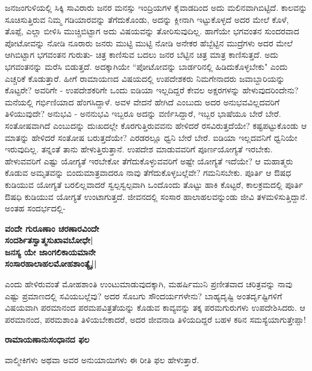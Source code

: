 ಜನಜಂಗುಳಿಯಲ್ಲಿ ಸಿಕ್ಕಿ ಸಾವಿರಾರು ಜನರ ಮನಸ್ಸು ಇಂದ್ರಿಯಗಳ ಕೈವಾಡದಿಂದ ಅದು ಮಲಿನವಾಗಿಬಿಟ್ಟಿದೆ. ಕಾಲವನ್ನು ಸೂಚಿಸುತ್ತಿರುವ ನಿಮ್ಮ ಗಡಿಯಾರವನ್ನು ತೆಗೆದುಕೊಂಡು, ಅದನ್ನು ಕ್ಲೀನಾಗಿ ಇಟ್ಟುಕೊಳ್ಳದೆ ಅದರ ಮೇಲೆ ಕೊಳೆ, ತೊಪ್ಪೆ, ಎಲ್ಲಾ ಬೀಳಿಸಿ ಮುಚ್ಚಿಬಿಟ್ಟಾಗ ಅದು ವಿಷಯವನ್ನು ತೋರಿಸುವುದಿಲ್ಲ. ಹಾಗೆಯೇ ಭಗವಂತನ ಸುಂದರವಾದ ಪೋಟೋವನ್ನು ನೋಡಿ ನೂರಾರು ಜನರು ಮುಟ್ಟಿ ಮುಟ್ಟಿ ನೋಡಿ ಅನೇಕರ ಹೆಬ್ಬೆಟ್ಟಿನ ಮುದ್ರೆಗಳು ಅದರ ಮೇಲೆ ಆಗಿಬಿಟ್ಟಾಗ ಭಗವಂತನ ಗುರುತು- ಚಿತ್ರ ಕಾಣಿಸುವ ಬದಲು ಜನರ ಬೆಟ್ಟಿನ ಚಿತ್ರ ಮಾತ್ರ ಕಾಣಿಸುತ್ತದೆ. ಅದು ಭಗವಂತನನ್ನು ಮರೆಸಿ ಬಿಡುತ್ತದೆ. ಅದಕ್ಕಾಗಿಯೇ ``ಪೋಟೋವನ್ನು ಬಾರ್ಡರಿನಲ್ಲಿ ಹಿಡಿದುಕೊಳ್ಳಬೇಕು" ಎಂದು ಎಚ್ಚರಿಕೆ ಕೊಡುತ್ತಾರೆ. ಹೀಗೆ ರಾಮಾಯಣದ ವಿಷಯದಲ್ಲಿ ಉಪದೇಶಕರು ನಿಮಗೇನಾದರು ಜವಾಬ್ದಾರಿಯನ್ನು ಕೊಟ್ಟರೇ? ಅವರಿಗೇ - ಉಪದೇಶಕರಿಗೇ ಒಂದು ಐಡಿಯಾ ಇಲ್ಲದಿದ್ದರೆ ಕೇವಲ ಅಕ್ಷರಗಳನ್ನು ಹೇಳುವುದರಿಂದೇನು? ಮನೆಯಲ್ಲಿ ಗರ್ಭಿಣಿಯಾದ ಹೆಂಗಸಿದ್ದಾಳೆ. ಅವಳ ವೇದನೆ ಹೇಗಿದೆ ಎಂಬುದು ಅದರ ಅನುಭವವಿಲ್ಲದವರಿಗೆ ತಿಳಿಯುವುದೇ? ಅನುಭವಿ - ಅನನುಭವಿ ಇಬ್ಬರೂ ಅದನ್ನು ವರ್ಣಿಸಿದ್ದಾರೆ, ಇಬ್ಬರ ಭಾಷೆಯೂ ಬೇರೆ ಬೇರೆ. ಸಂತೋಷವಾಗಿದೆ ಎಂಬುದನ್ನು ದುಃಖದಲ್ಲೇ ಕೊರಗುತ್ತಿರುವವನು ಹೇಳಿದರೆ ರಸವಿರುತ್ತದೆಯೇ? ಕಷ್ಟಪಟ್ಟುಕೊಂಡು ಆ ಮಾತನ್ನು ಹೇಳಿದರೆ ಸಂತೋಷ ಬರುತ್ತದೆಯೇ? ಎರಡರಲ್ಲೂ ಧ್ವನಿ ಬೇರೆ ಬೇರೆ. ಐಡಿಯಾ ಇಲ್ಲದವನಿಗೆ ಧ್ವನಿಯೇ ಇರುವುದಿಲ್ಲ. ತನ್ನಂತೆ ತಾನು ಹೇಳುತ್ತಿರುತ್ತಾನೆ. ಉಪದೇಶ ಮಾಡುವವರಿಗೆ ಪೂರ್ಣಯೋಗ್ಯತೆ ಇರಬೇಕು. ಹೇಳುವವರಿಗೆ ಎಷ್ಟು ಯೋಗ್ಯತೆ ಇರಬೇಕೋ ತೆಗೆದುಕೊಳ್ಳುವವರಿಗೆ ಅಷ್ಟೇ ಯೋಗ್ಯತೆ ಇದೆಯೇ? ಆ ಮಹಾತ್ಮರು ಕೊಡುವ ಅಮೃತವನ್ನು ಬಿಂದುಮಾತ್ರವಾದರೂ ನಾವು ತೆಗೆದುಕೊಳ್ಳಬಲ್ಲೆವೇ? ಗಮನಿಸಬೇಕು. ಪೂರ್ತಿ ಆ ಔಷಧ ಕುಡಿಯುವ ಯೋಗ್ಯತೆ ಬರಲಿಲ್ಲವಾದರೆ ಸ್ವಲ್ಪಸ್ವಲ್ಪವಾಗಿ ಒಂದೊಂದು ತೊಟ್ಟು ಹಾಕಿ ಕೊಟ್ಟರೆ, ಕಾಲಕ್ರಮದಲ್ಲಿ ಪೂರ್ತಿ ಔಷಧಿ ಕುಡಿಯುವ ಯೋಗ್ಯತೆ ಉಂಟಾಗುತ್ತದೆ. ಜೀವನದಲ್ಲಿ ಸಂಸಾರ ಹಾಲಾಹಲವನ್ನುಂಡು ಜೀವಿ ತಳಮಳಿಸುತ್ತಿದ್ದಾನೆ. ಅಂತಹ ಸಂದರ್ಭದಲ್ಲಿ- 


\begin{center} 

{\bf ವಂದೇ ಗುರೂಣಾಂ ಚರಣಾರವಿಂದೇ\\ 

ಸಂದರ್ಶಿತಸ್ವಾತ್ಮಸುಖಾವಬೋಧೇ|\\ 

ಜನಸ್ಯ ಯೇ ಜಾಂಗಲಿಕಾಯಮಾನೇ\\ 

ಸಂಸಾರಹಾಲಾಹಲಮೋಹಶಾಂತ್ಯೈ||} 

\end{center} 


ಎಂದು ಹೇಳಿರುವಂತೆ ಮೋಹಶಾಂತಿ ಉಂಟುಮಾಡುವುದಕ್ಕಾಗಿ, ಮಹರ್ಷಿಮುನಿ ಪ್ರಣೀತವಾದ ಚರಿತ್ರವನ್ನು ನಾವು ಎಷ್ಟು ಪ್ರಮಾಣದಲ್ಲಿ ಸವಿಯಬಲ್ಲೆವು? ಅದರ ಸೊಬಗು ಸೌಂದರ್ಯಗಳೇನು? ಬಾಹ್ಯದೃಷ್ಟಿ ಅಂತರ್ದೃಷ್ಟಿಗಳಿಗೆ ವಿಷಯವಾಗಿ ಪರಮಾನಂದ ಪರಮಪವಿತ್ರತೆಯನ್ನು ಕೊಡುವ ಕಾವ್ಯವನ್ನು ತಕ್ಕ ಪರಮಗುರುಗಳು ಉಪದೇಶಿಸಿದರು. ಆ ಪರಮಾನಂದ, ಪರಮಶಾಂತಿ ತಿಳಿಯಬೇಕಾದರೆ, ಅದರ ಜೀವನಾಡಿ ತಿಳಿಯದಿದ್ದರೆ ಬಹಳ ಕಠಿನ ಸಮಸ್ಯೆಯಾಗುತ್ತೇಪ್ಪಾ! 


\large{{\bf ರಾಮಾಯಣಾನುಸಂಧಾನದ ಫಲ}} 


ವಾಲ್ಮೀಕಿಗಳು ಅಥವಾ ಅವರ ಅನುಯಾಯಿಗಳು ಈ ರೀತಿ ಫಲ ಹೇಳುತ್ತಾರೆ. 


